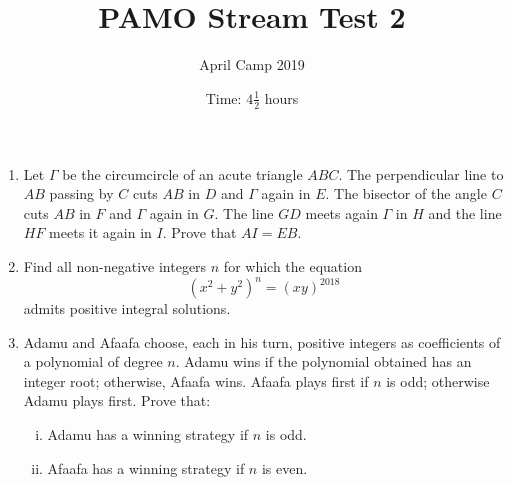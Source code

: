 \documentclass[a4paper, 12pt]{article}
\title{PAMO Stream Test 2}
\author{April Camp 2019}
\date{Time: $4 \frac{1}{2}$ hours}
\begin{document}
 \maketitle

\begin{enumerate}

\item Let $\Gamma$ be the circumcircle of an acute triangle $ABC$. The perpendicular line to $AB$ passing by $C$ cuts $AB$ in $D$ and $\Gamma$ again in $E$. The bisector of the angle $C$ cuts $AB$ in $F$ and $\Gamma$ again in $G$. The line $GD$ meets again $\Gamma$ in $H$ and the line $HF$ meets it again in $I$. Prove that $AI = EB$.


\item Find all non-negative integers $n$ for which the equation
\[
    {\left( x^2 + y^2 \right)}^n = {(xy)}^{2018}
\]
admits positive integral solutions.


\item Adamu and Afaafa choose, each in his turn, positive integers as coefficients of a polynomial of degree $n$. Adamu wins if the polynomial obtained has an integer root; otherwise, Afaafa wins. Afaafa plays first if $n$ is odd; otherwise Adamu plays first. Prove that:
\begin{enumerate}[i)]

\item Adamu has a winning strategy if $n$ is odd.

\item Afaafa has a winning strategy if $n$ is even.

\end{enumerate}


\end{enumerate}

\vfill

\centering

\vspace{12mm}
\end{document}
